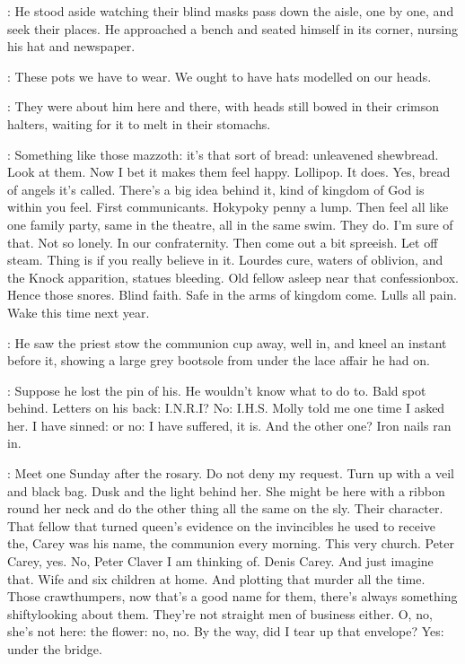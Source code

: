 :
He stood aside
watching their blind masks pass down the aisle,
one by one,
and seek their places.
He approached a bench and seated himself in its corner,
nursing his hat and newspaper.

\BloomInt:
These pots we have to wear.
We ought to have hats modelled on our heads.

:
They were about him here and there,
with heads still bowed in their crimson halters,
waiting for it to melt in their stomachs.

\BloomInt:
Something like those mazzoth:
it's that sort of bread:
unleavened shewbread.
Look at them.
Now I bet it makes them feel happy.
Lollipop.
It does.
Yes, bread of angels it's called.
There's a big idea behind it,
kind of kingdom of God is within you feel.
First communicants.
Hokypoky penny a lump.
Then feel all like one family party,
same in the theatre, all in the same swim.
They do.
I'm sure of that.
Not so lonely.
In our confraternity.
Then come out a bit spreeish.
Let off steam.
Thing is if you really believe in it.
Lourdes cure,
waters of oblivion,
and the Knock apparition,
statues bleeding.
Old fellow asleep near that confessionbox.
Hence those snores.
Blind faith.
Safe in the arms of kingdom come.
Lulls all pain.
Wake this time next year.

:
He saw the priest stow the communion cup away,
well in,
and kneel an instant before it,
showing a large grey bootsole from under the lace affair he had on.

\BloomInt:
Suppose he lost the pin of his.
He wouldn't know what to do to.
Bald spot behind.
Letters on his back:
I.N.R.I?
No:
I.H.S.
Molly told me one time I asked her.
I have sinned:
or no:
I have suffered, it is.
And the other one?
Iron nails ran in.

\BloomInt:
Meet one Sunday after the rosary.
Do not deny my request.
Turn up with a veil and black bag.
Dusk and the light behind her.
She might be here with a ribbon round her neck
and do the other thing all the same on the sly.
Their character.
That fellow that turned queen's evidence on the invincibles
he used to receive the,
Carey was his name,
the communion every morning.
This very church.
Peter Carey, yes.
No, Peter Claver I am
thinking of.
Denis Carey.
And just imagine that.
Wife and six children at home.
And plotting that murder all the time.
Those crawthumpers,
now that's a good name for them,
there's always something shiftylooking about them.
They're not straight men of business either.
O, no, she's not here:
the flower:
no, no.
By the way, did I tear up that envelope?
Yes: under the bridge.

